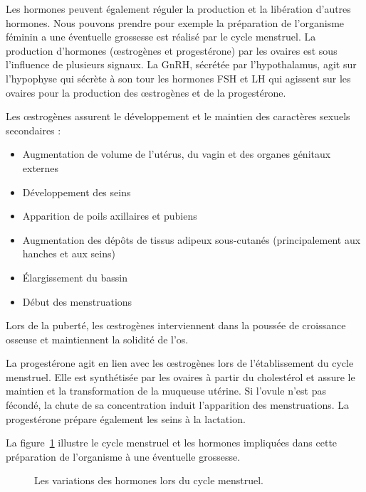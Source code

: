       Les hormones peuvent également réguler la production et la libération d'autres hormones.
      Nous pouvons prendre pour exemple la préparation de l'organisme féminin a une éventuelle grossesse est réalisé par le cycle menstruel.
      La production d'hormones ({\oe}strogènes et progestérone) par les ovaires est sous l'influence de plusieurs signaux.
      La GnRH, sécrétée par l'hypothalamus, agit sur l'hypophyse qui sécrète à son tour les hormones FSH et LH qui agissent sur les ovaires pour la production des {\oe}strogènes et de la progestérone.

      Les {\oe}strogènes assurent le développement et le maintien des caractères sexuels secondaires :
      \begin{itemize}
          \item   Augmentation de volume de l'utérus, du vagin et des organes génitaux externes
          \item   Développement des seins
          \item   Apparition de poils axillaires et pubiens
          \item   Augmentation des dépôts de tissus adipeux sous-cutanés (principalement aux hanches et aux seins)
          \item   Élargissement du bassin
          \item   Début des menstruations
      \end{itemize}
      \vspace{1.5ex}

      Lors de la puberté, les {\oe}strogènes interviennent dans la poussée de croissance osseuse et maintiennent la solidité de l'os.

      La progestérone agit en lien avec les {\oe}strogènes lors de l'établissement du cycle menstruel.
      Elle est synthétisée par les ovaires à partir du cholestérol et assure le maintien et la transformation de la muqueuse utérine.
      Si l'ovule n'est pas fécondé, la chute de sa concentration induit l'apparition des menstruations.
      La progestérone prépare également les seins à la lactation.

      La figure~\ref{fig:Cycle_menstruel} illustre le cycle menstruel et les hormones impliquées dans cette préparation de l'organisme à une éventuelle grossesse.

      \begin{figure}
        \begin{center}
          \def\svgwidth{\columnwidth}
          \caption{Les variations des hormones lors du cycle menstruel.}
          \label{fig:Cycle_menstruel}
        \end{center}
      \end{figure}

